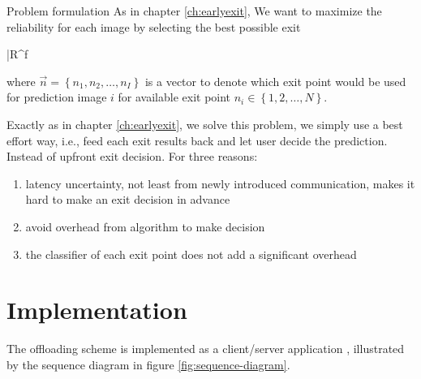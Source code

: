 \begin{enumdescript}
		\item[Problem formulation]   As in chapter \ref{ch:earlyexit},  We want to maximize the reliability for each image by selecting the best possible exit
		
		
		\begin{maxi}
			{}{\bar{R}^f}
			{}{}
		\end{maxi}
	
		where $ \vec{n} = \left\{ n_1, n_2, \dots, n_I \right\}$ is a vector to denote which exit point would be used for prediction image $ i $ for available exit point $ n_i \in \left\{1,2, \dots, N\right\} $.
		
		Exactly as in chapter \ref{ch:earlyexit}, we solve this problem, we simply use a best effort way, i.e., feed each exit results back and let user decide the prediction. Instead of upfront exit decision. For three reasons:
		\begin{enumerate}
			\item latency uncertainty, not least from newly introduced communication, makes it hard to make an exit decision in advance
			\item avoid overhead from algorithm to make decision
			\item the classifier of each exit point does not add a significant overhead
		\end{enumerate}
		
			
	\end{enumdescript}  

\section{Implementation} \label{sec:edge-implementation}

The offloading scheme is implemented as a client/server application \cite{sommerville_software_2015}, illustrated by the sequence diagram in figure \ref{fig:sequence-diagram}. 


